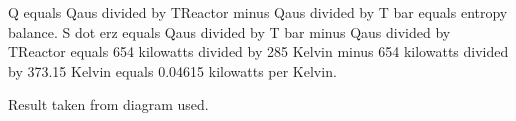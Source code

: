 Q equals Qaus divided by TReactor minus Qaus divided by T bar equals entropy balance.  
S dot erz equals Qaus divided by T bar minus Qaus divided by TReactor equals 654 kilowatts divided by 285 Kelvin minus 654 kilowatts divided by 373.15 Kelvin equals 0.04615 kilowatts per Kelvin.  

Result taken from diagram used.